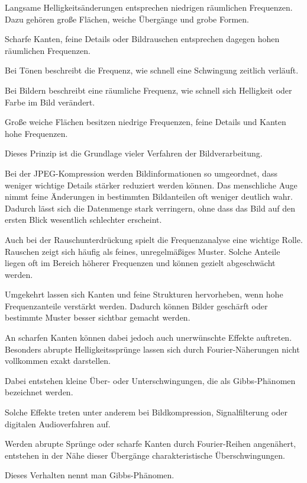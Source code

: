 Langsame Helligkeitsänderungen entsprechen niedrigen räumlichen Frequenzen.
Dazu gehören große Flächen,
weiche Übergänge
und grobe Formen.

Scharfe Kanten,
feine Details
oder Bildrauschen entsprechen dagegen hohen räumlichen Frequenzen.

\begin{DidacticBox}
	\small
	\label{box:fourier-frequenzen-in-bildern}
	Bei Tönen beschreibt die Frequenz,
	wie schnell eine Schwingung zeitlich verläuft.
	
	Bei Bildern beschreibt eine räumliche Frequenz,
	wie schnell sich Helligkeit oder Farbe im Bild verändert.
	
	Große weiche Flächen besitzen niedrige Frequenzen,
	feine Details und Kanten hohe Frequenzen.
\end{DidacticBox}

Dieses Prinzip ist die Grundlage vieler Verfahren der Bildverarbeitung.

Bei der JPEG-Kompression werden Bildinformationen so umgeordnet,
dass weniger wichtige Details stärker reduziert werden können.
Das menschliche Auge nimmt feine Änderungen in bestimmten Bildanteilen
oft weniger deutlich wahr.
Dadurch lässt sich die Datenmenge stark verringern,
ohne dass das Bild auf den ersten Blick wesentlich schlechter erscheint.

Auch bei der Rauschunterdrückung spielt die Frequenzanalyse eine wichtige Rolle.
Rauschen zeigt sich häufig als feines,
unregelmäßiges Muster.
Solche Anteile liegen oft im Bereich höherer Frequenzen
und können gezielt abgeschwächt werden.

Umgekehrt lassen sich Kanten und feine Strukturen hervorheben,
wenn hohe Frequenzanteile verstärkt werden.
Dadurch können Bilder geschärft
oder bestimmte Muster besser sichtbar gemacht werden.

An scharfen Kanten können dabei jedoch auch unerwünschte Effekte auftreten.
Besonders abrupte Helligkeitssprünge lassen sich durch Fourier-Näherungen
nicht vollkommen exakt darstellen.

Dabei entstehen kleine Über- oder Unterschwingungen,
die als Gibbs-Phänomen bezeichnet werden.

Solche Effekte treten unter anderem
bei Bildkompression,
Signalfilterung
oder digitalen Audioverfahren auf.

\begin{DidacticBox}
	\small
	\label{box:fourier-gibbs-phaenomen}
	Werden abrupte Sprünge oder scharfe Kanten
	durch Fourier-Reihen angenähert,
	entstehen in der Nähe dieser Übergänge
	charakteristische Überschwingungen.
	
	Dieses Verhalten nennt man Gibbs-Phänomen.
\end{DidacticBox}

